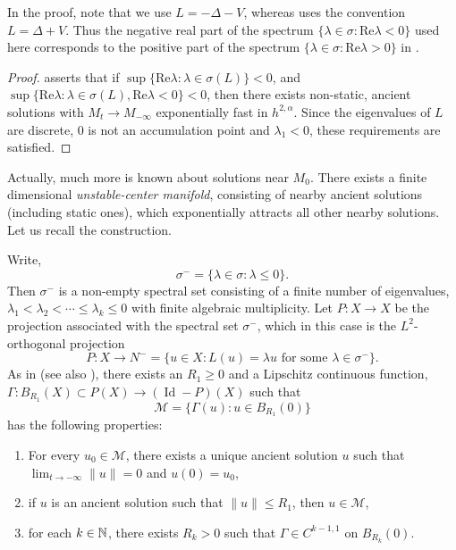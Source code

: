 \documentclass{amsart}
\begin{document}
\begin{rem}
In the proof, note that we use \(L = -\Delta - V\), whereas \cite{lunardi2012analytic} uses the convention \(L = \Delta + V\). Thus the negative real part of the spectrum \(\{\lambda \in \sigma : \text{Re} \lambda < 0\}\) used here corresponds to the positive part of the spectrum \(\{\lambda \in \sigma : \text{Re} \lambda > 0\}\) in \cite{lunardi2012analytic}.
\end{rem}

\begin{proof}
\cite[Theorem 9.1.3]{lunardi2012analytic} asserts that if \(\sup \{\text{Re}\lambda : \lambda \in \sigma(L)\} < 0\), and \(\sup\{\text{Re} \lambda : \lambda \in \sigma(L), \text{Re} \lambda < 0\} < 0\), then there exists non-static, ancient solutions with \(M_t \to M_{-\infty}\) exponentially fast in \(h^{2,\alpha}\). Since the eigenvalues of \(L\) are discrete, \(0\) is not an accumulation point and \(\lambda_1 < 0\), these requirements are satisfied.
\end{proof}

Actually, much more is known about solutions near \(M_0\). There exists a finite dimensional \emph{unstable-center manifold}, consisting of nearby ancient solutions (including static ones), which exponentially attracts all other nearby solutions. Let us recall the construction.

Write,
\[
\sigma^- = \{\lambda \in \sigma : \lambda \leq 0\}.
\]
Then \(\sigma^-\) is a non-empty spectral set consisting of a finite number of eigenvalues, \(\lambda_1 < \lambda_2 < \cdots \leq \lambda_k \leq 0\) with finite algebraic multiplicity. Let \(P: X \to X\) be the projection associated with the spectral set \(\sigma^-\), which in this case is the \(L^2\)-orthogonal projection
\[
P : X \to N^- = \{u \in X : L(u) = \lambda u \text{ for some } \lambda \in \sigma^-\}.
\]
As in \cite[Theorem 4.1]{Simonett:/1995} (see also \cite[Theorem 9.2.2]{lunardi2012analytic}), there exists an \(R_1 \geq 0\) and a Lipschitz continuous function, \(\Gamma : B_{R_1}(X) \subset P(X) \to (\operatorname{Id} - P)(X)\) such that
\[
\mathcal{M} = \{\Gamma(u) : u \in B_{R_1}(0)\}
\]
has the following properties:
\begin{enumerate}
\item For every \(u_0 \in \mathcal{M}\), there exists a unique ancient solution \(u\) such that \(\lim_{t\to-\infty} \|u\| = 0\) and \(u(0) = u_0\),
\item if \(u\) is an ancient solution such that \(\|u\| \leq R_1\), then \(u \in \mathcal{M}\),
\item for each \(k \in \mathbb{N}\), there exists \(R_k > 0\) such that \(\Gamma \in C^{k-1,1}\) on \(B_{R_k}(0)\).
\end{enumerate}
\end{document}
